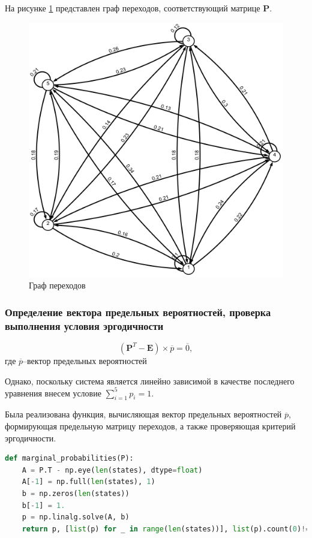 На рисунке \ref{graph} представлен граф переходов, соответствующий матрице $\mathbf{P}$.
\begin{figure}[!h]
\centerline{\includegraphics[width = 0.7\columnwidth]{Images/graph.png}}
\caption{Граф переходов}
\label{graph}
\end{figure}

\subsubsection{Определение вектора предельных вероятностей, проверка выполнения условия эргодичности}


$$(\mathbf{P}^T-\mathbf{E})\times\overline{p}=\overline{0},$$
где $\overline{p}$--вектор предельных вероятностей

Однако, поскольку система является линейно зависимой в качестве последнего уравнения внесем условие $\sum\limits_{i=1}^5p_i=1$.

Была реализована функция, вычисляющая вектор предельных вероятностей  $\overline{p}$, формирующая предельную матрицу переходов, а также проверяющая критерий эргодичности.

\begin{lstlisting}[language=python, label=prog,caption={\textit{расчет вектора предельных вероятностей}}]
def marginal_probabilities(P):
    A = P.T - np.eye(len(states), dtype=float)
    A[-1] = np.full(len(states), 1)
    b = np.zeros(len(states))
    b[-1] = 1.
    p = np.linalg.solve(A, b)
    return p, [list(p) for _ in range(len(states))], list(p).count(0)!=len(p)
\end{lstlisting}

~\\

